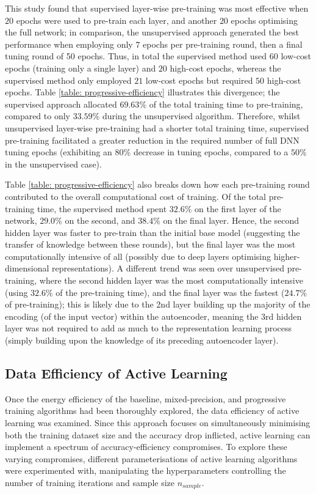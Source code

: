 \documentclass[a4paper, 11pt]{report}
\begin{document}
    This study found that supervised layer-wise pre-training was most effective when $20$ epochs were used to pre-train each layer, and another $20$ epochs optimising the full network; in comparison, the unsupervised approach generated the best performance when employing only $7$ epochs per pre-training round, then a final tuning round of 50 epochs. Thus, in total the supervised method used $60$ low-cost epochs (training only a single layer) and $20$ high-cost epochs, whereas the supervised method only employed $21$ low-cost epochs but required $50$ high-cost epochs. Table \ref{table: progressive-efficiency} illustrates this divergence; the supervised approach allocated $69.63\%$ of the total training time to pre-training, compared to only $33.59\%$ during the unsupervised algorithm. Therefore, whilst unsupervised layer-wise pre-training had a shorter total training time, supervised pre-training facilitated a greater reduction in the required number of full DNN tuning epochs (exhibiting an $80\%$ decrease in tuning epochs, compared to a $50\%$ in the unsupervised case).

    Table \ref{table: progressive-efficiency} also breaks down how each pre-training round contributed to the overall computational cost of training. Of the total pre-training time, the supervised method spent $32.6\%$ on the first layer of the network, $29.0\%$ on the second, and $38.4\%$ on the final layer. Hence, the second hidden layer was faster to pre-train than the initial base model (suggesting the transfer of knowledge between these rounds), but the final layer was the most computationally intensive of all (possibly due to deep layers optimising higher-dimensional representations). A different trend was seen over unsupervised pre-training, where the second hidden layer was the most computationally intensive (using $32.6\%$ of the pre-training time), and the final layer was the fastest ($24.7\%$ of pre-training); this is likely due to the 2nd layer building up the majority of the encoding (of the input vector) within the autoencoder, meaning the 3rd hidden layer was not required to add as much to the representation learning process (simply building upon the knowledge of its preceding autoencoder layer).


    \subsection{Data Efficiency of Active Learning}

    Once the energy efficiency of the baseline, mixed-precision, and progressive training algorithms had been thoroughly explored, the data efficiency of active learning was examined. Since this approach focuses on simultaneously minimising both the training dataset size and the accuracy drop inflicted, active learning can implement a spectrum of accuracy-efficiency compromises. To explore these varying compromises, different parameterisations of active learning algorithms were experimented with, manipulating the hyperparameters controlling the number of training iterations and sample size $n_{sample}$. 
\end{document}
